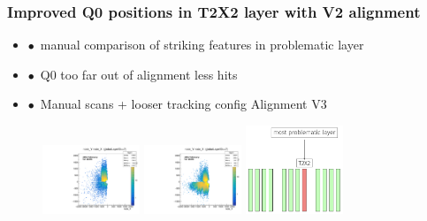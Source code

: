 \documentclass[aspectratio=1610, 12pt, xcolor=dvipsnames]{beamer}
\begin{document}
\begin{frame}\frametitle{Improved Q0 positions in T2X2 layer with V2 alignment}
  \begin{itemize}
    \item $\bullet$\, manual comparison of striking features in problematic layer
    \item $\bullet$\, Q0 too far out of alignment \to less hits
    \item $\bullet$\, Manual scans + looser tracking config \to Alignment V3
  \end{itemize}
  \begin{figure}
    \includegraphics[width=0.26\textwidth]{logos/2D_nodeXY_v2_7_left.pdf}%
    \includegraphics[width=0.26\textwidth]{logos/2D_nodeXY_quartermean_7_left.pdf}%
    \includegraphics[width=0.26\textwidth]{problem_layer.png}%
  \end{figure}
\end{frame}
\end{document}
